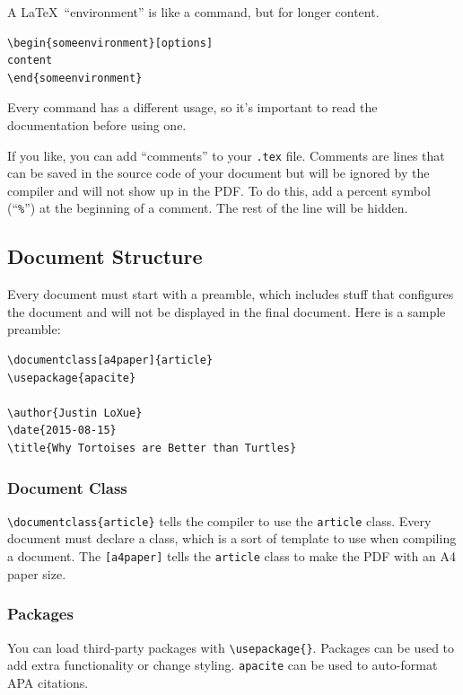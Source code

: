 \documentclass{chan}
\begin{document}
A \LaTeX\ ``environment'' is like a command, but for longer content.

\begin{lstlisting}
\begin{someenvironment}[options]
content
\end{someenvironment}
\end{lstlisting}

Every command has a different usage, so it's important to read the documentation before using one.

If you like, you can add ``comments'' to your \verb$.tex$ file.
Comments are lines that can be saved in the source code of your document but will be ignored by the compiler and will not show up in the PDF.
To do this, add a percent symbol (``\verb$%$'') at the beginning of a comment.
The rest of the line will be hidden.

\subsection{Document Structure}

Every document must start with a preamble, which includes stuff that configures the document and will not be displayed in the final document.
Here is a sample preamble:

\begin{lstlisting}
\documentclass[a4paper]{article}
\usepackage{apacite}

\author{Justin LoXue}
\date{2015-08-15}
\title{Why Tortoises are Better than Turtles}
\end{lstlisting}

\subsubsection{Document Class}

\lstinline$\documentclass{article}$ tells the compiler to use the \verb$article$ class.
Every document must declare a class, which is a sort of template to use when compiling a document.
The \verb$[a4paper]$ tells the \verb$article$ class to make the PDF with an A4 paper size.

\subsubsection{Packages}

You can load third-party packages with \lstinline$\usepackage{}$.
Packages can be used to add extra functionality or change styling.
\verb$apacite$ can be used to auto-format APA citations.
\end{document}
